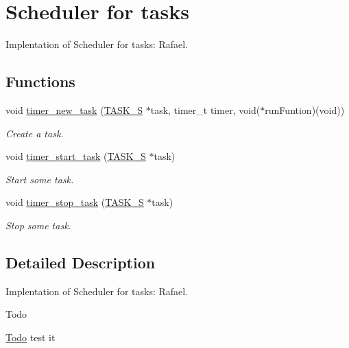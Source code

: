 \hypertarget{group__taskS}{\section{Scheduler for tasks}
\label{group__taskS}
}


Implentation of Scheduler for tasks\-:  Rafael.  


\subsection*{Functions}
\begin{DoxyCompactItemize}
\item 
void \hyperlink{group__taskS_ga7fe41c61473ba12f9b4fccebde3698fe}{timer\-\_\-new\-\_\-task} (\hyperlink{structTASK__S}{T\-A\-S\-K\-\_\-\-S} $\ast$task, timer\-\_\-t timer, void($\ast$run\-Funtion)(void))
\begin{DoxyCompactList}\small\item\em Create a task. \end{DoxyCompactList}\item 
void \hyperlink{group__taskS_gac088a054258396a6e2dba77908f22b42}{timer\-\_\-start\-\_\-task} (\hyperlink{structTASK__S}{T\-A\-S\-K\-\_\-\-S} $\ast$task)
\begin{DoxyCompactList}\small\item\em Start some task. \end{DoxyCompactList}\item 
void \hyperlink{group__taskS_ga8e48eacaac7d9cf7d82cc71cfbcd4b56}{timer\-\_\-stop\-\_\-task} (\hyperlink{structTASK__S}{T\-A\-S\-K\-\_\-\-S} $\ast$task)
\begin{DoxyCompactList}\small\item\em Stop some task. \end{DoxyCompactList}\end{DoxyCompactItemize}


\subsection{Detailed Description}
Implentation of Scheduler for tasks\-:  Rafael. \begin{DoxyRefDesc}{Todo}
\item[\hyperlink{todo__todo000004}{Todo}]test it \end{DoxyRefDesc}



